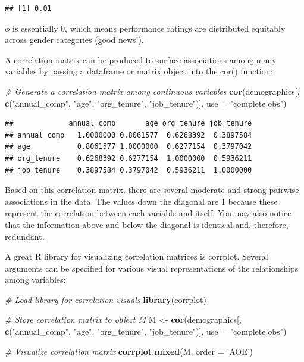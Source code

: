 \documentclass[]{book}
\newenvironment{Shaded}{\begin{snugshade}}{\end{snugshade}}
\newcommand{\CommentTok}[1]{\textcolor[rgb]{0.56,0.35,0.01}{\textit{#1}}}
\newcommand{\DataTypeTok}[1]{\textcolor[rgb]{0.13,0.29,0.53}{#1}}
\newcommand{\KeywordTok}[1]{\textcolor[rgb]{0.13,0.29,0.53}{\textbf{#1}}}
\newcommand{\NormalTok}[1]{#1}
\newcommand{\StringTok}[1]{\textcolor[rgb]{0.31,0.60,0.02}{#1}}
\begin{document}
\begin{verbatim}
## [1] 0.01
\end{verbatim}

\(\phi\) is essentially 0, which means performance ratings are distributed equitably across gender categories (good news!).

A correlation matrix can be produced to surface associations among many variables by passing a dataframe or matrix object into the cor() function:

\begin{Shaded}
\begin{Highlighting}[]
\CommentTok{# Generate a correlation matrix among continuous variables}
\KeywordTok{cor}\NormalTok{(demographics[, }\KeywordTok{c}\NormalTok{(}\StringTok{"annual_comp"}\NormalTok{, }\StringTok{"age"}\NormalTok{, }\StringTok{"org_tenure"}\NormalTok{, }\StringTok{"job_tenure"}\NormalTok{)], }\DataTypeTok{use =} \StringTok{"complete.obs"}\NormalTok{)}
\end{Highlighting}
\end{Shaded}

\begin{verbatim}
##             annual_comp       age org_tenure job_tenure
## annual_comp   1.0000000 0.8061577  0.6268392  0.3897584
## age           0.8061577 1.0000000  0.6277154  0.3797042
## org_tenure    0.6268392 0.6277154  1.0000000  0.5936211
## job_tenure    0.3897584 0.3797042  0.5936211  1.0000000
\end{verbatim}

Based on this correlation matrix, there are several moderate and strong pairwise associations in the data. The values down the diagonal are 1 because these represent the correlation between each variable and itself. You may also notice that the information above and below the diagonal is identical and, therefore, redundant.

A great R library for visualizing correlation matrices is corrplot. Several arguments can be specified for various visual representations of the relationships among variables:

\begin{Shaded}
\begin{Highlighting}[]
\CommentTok{# Load library for correlation visuals}
\KeywordTok{library}\NormalTok{(corrplot)}

\CommentTok{# Store correlation matrix to object M}
\NormalTok{M <-}\StringTok{ }\KeywordTok{cor}\NormalTok{(demographics[, }\KeywordTok{c}\NormalTok{(}\StringTok{"annual_comp"}\NormalTok{, }\StringTok{"age"}\NormalTok{, }\StringTok{"org_tenure"}\NormalTok{, }\StringTok{"job_tenure"}\NormalTok{)], }\DataTypeTok{use =} \StringTok{"complete.obs"}\NormalTok{)}

\CommentTok{# Visualize correlation matrix}
\KeywordTok{corrplot.mixed}\NormalTok{(M, }\DataTypeTok{order =} \StringTok{'AOE'}\NormalTok{)}
\end{Highlighting}
\end{Shaded}
\end{document}
